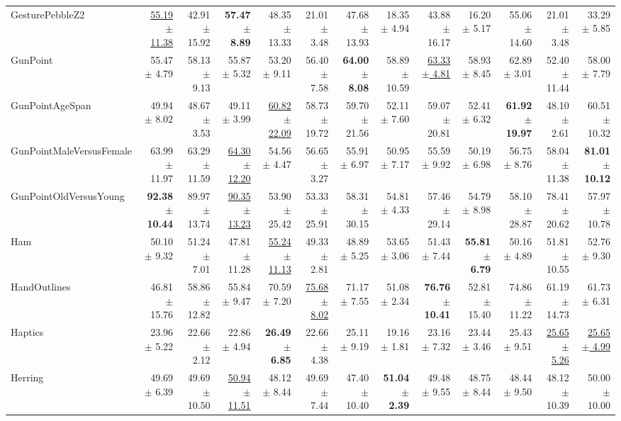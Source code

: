 \begin{landscape}
\begin{longtable}{lrrrrrrrrrrrr}
GesturePebbleZ2 & \underline{55.19 $\pm$ 11.38} & 42.91 $\pm$ 15.92 & \textbf{57.47 $\pm$ 8.89} & 48.35 $\pm$ 13.33 & 21.01 $\pm$ 3.48 & 47.68 $\pm$ 13.93 & 18.35 $\pm$ 4.94 & 43.88 $\pm$ 16.17 & 16.20 $\pm$ 5.17 & 55.06 $\pm$ 14.60 & 21.01 $\pm$ 3.48 & 33.29 $\pm$ 5.85 \\
GunPoint & 55.47 $\pm$ 4.79 & 58.13 $\pm$ 9.13 & 55.87 $\pm$ 5.32 & 53.20 $\pm$ 9.11 & 56.40 $\pm$ 7.58 & \textbf{64.00 $\pm$ 8.08} & 58.89 $\pm$ 10.59 & \underline{63.33 $\pm$ 4.81} & 58.93 $\pm$ 8.45 & 62.89 $\pm$ 3.01 & 52.40 $\pm$ 11.44 & 58.00 $\pm$ 7.79 \\
GunPointAgeSpan & 49.94 $\pm$ 8.02 & 48.67 $\pm$ 3.53 & 49.11 $\pm$ 3.99 & \underline{60.82 $\pm$ 22.09} & 58.73 $\pm$ 19.72 & 59.70 $\pm$ 21.56 & 52.11 $\pm$ 7.60 & 59.07 $\pm$ 20.81 & 52.41 $\pm$ 6.32 & \textbf{61.92 $\pm$ 19.97} & 48.10 $\pm$ 2.61 & 60.51 $\pm$ 10.32 \\
GunPointMaleVersusFemale & 63.99 $\pm$ 11.97 & 63.29 $\pm$ 11.59 & \underline{64.30 $\pm$ 12.20} & 54.56 $\pm$ 4.47 & 56.65 $\pm$ 3.27 & 55.91 $\pm$ 6.97 & 50.95 $\pm$ 7.17 & 55.59 $\pm$ 9.92 & 50.19 $\pm$ 6.98 & 56.75 $\pm$ 8.76 & 58.04 $\pm$ 11.38 & \textbf{81.01 $\pm$ 10.12} \\
GunPointOldVersusYoung & \textbf{92.38 $\pm$ 10.44} & 89.97 $\pm$ 13.74 & \underline{90.35 $\pm$ 13.23} & 53.90 $\pm$ 25.42 & 53.33 $\pm$ 25.91 & 58.31 $\pm$ 30.15 & 54.81 $\pm$ 4.33 & 57.46 $\pm$ 29.14 & 54.79 $\pm$ 8.98 & 58.10 $\pm$ 28.87 & 78.41 $\pm$ 20.62 & 57.97 $\pm$ 10.78 \\
Ham & 50.10 $\pm$ 9.32 & 51.24 $\pm$ 7.01 & 47.81 $\pm$ 11.28 & \underline{55.24 $\pm$ 11.13} & 49.33 $\pm$ 2.81 & 48.89 $\pm$ 5.25 & 53.65 $\pm$ 3.06 & 51.43 $\pm$ 7.44 & \textbf{55.81 $\pm$ 6.79} & 50.16 $\pm$ 4.89 & 51.81 $\pm$ 10.55 & 52.76 $\pm$ 9.30 \\
HandOutlines & 46.81 $\pm$ 15.76 & 58.86 $\pm$ 12.82 & 55.84 $\pm$ 9.47 & 70.59 $\pm$ 7.20 & \underline{75.68 $\pm$ 8.02} & 71.17 $\pm$ 7.55 & 51.08 $\pm$ 2.34 & \textbf{76.76 $\pm$ 10.41} & 52.81 $\pm$ 15.40 & 74.86 $\pm$ 11.22 & 61.19 $\pm$ 14.73 & 61.73 $\pm$ 6.31 \\
Haptics & 23.96 $\pm$ 5.22 & 22.66 $\pm$ 2.12 & 22.86 $\pm$ 4.94 & \textbf{26.49 $\pm$ 6.85} & 22.66 $\pm$ 4.38 & 25.11 $\pm$ 9.19 & 19.16 $\pm$ 1.81 & 23.16 $\pm$ 7.32 & 23.44 $\pm$ 3.46 & 25.43 $\pm$ 9.51 & \underline{25.65 $\pm$ 5.26} & \underline{25.65 $\pm$ 4.99} \\
Herring & 49.69 $\pm$ 6.39 & 49.69 $\pm$ 10.50 & \underline{50.94 $\pm$ 11.51} & 48.12 $\pm$ 8.44 & 49.69 $\pm$ 7.44 & 47.40 $\pm$ 10.40 & \textbf{51.04 $\pm$ 2.39} & 49.48 $\pm$ 9.55 & 48.75 $\pm$ 8.44 & 48.44 $\pm$ 9.50 & 48.12 $\pm$ 10.39 & 50.00 $\pm$ 10.00 \\

\end{longtable}
\end{landscape}
